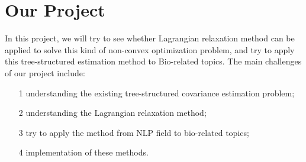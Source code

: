 \documentclass[11pt, reqno]{amsart}
\begin{document}
\section{Our Project}
In this project, we will try to see whether Lagrangian relaxation method can be applied to solve this kind of non-convex optimization problem, and try to apply this tree-structured estimation method to Bio-related topics.
The main challenges of our project include:
\begin{itemize}
\item[1] understanding the existing tree-structured covariance estimation problem;
\item[2] understanding the Lagrangian relaxation method;
\item[3] try to apply the method from NLP field to bio-related topics;
\item[4] implementation of these methods.
\end{itemize}

\iffalse


\end{document}

